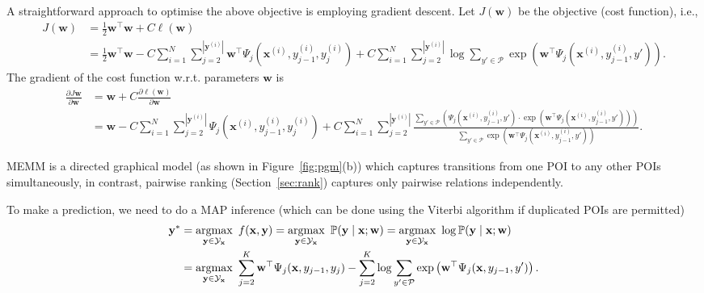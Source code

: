 A straightforward approach to optimise the above objective is employing gradient descent. 
Let $J(\mathbf{w})$ be the objective (cost function), i.e.,
\begin{align*}
J(\mathbf{w}) 
&= \frac{1}{2} \mathbf{w}^\top \mathbf{w} + C \ell(\mathbf{w}) \\
&= \frac{1}{2} \mathbf{w}^\top \mathbf{w} -
   C \sum_{i=1}^N \sum_{j=2}^{| \mathbf{y}^{(i)} |} \mathbf{w}^\top \Psi_j(\mathbf{x}^{(i)}, y_{j-1}^{(i)}, y_j^{(i)}) +
   C \sum_{i=1}^N \sum_{j=2}^{| \mathbf{y}^{(i)} |} \log \sum_{y' \in \mathcal{P}} 
     \exp \left(\mathbf{w}^\top \Psi_j(\mathbf{x}^{(i)}, y_{j-1}^{(i)}, y') \right).
\end{align*}
The gradient of the cost function w.r.t. parameters $\mathbf{w}$ is
\begin{align*}
\frac{\partial J{\mathbf{w}}}{\partial \mathbf{w}}
&= \mathbf{w} + C \frac{\partial \ell(\mathbf{w})}{\partial \mathbf{w}} \\
&= \mathbf{w} - C \sum_{i=1}^N \sum_{j=2}^{| \mathbf{y}^{(i)} |} \Psi_j(\mathbf{x}^{(i)}, y_{j-1}^{(i)}, y_j^{(i)}) +
   C \sum_{i=1}^N \sum_{j=2}^{| \mathbf{y}^{(i)} |} 
     \frac{\sum_{y' \in \mathcal{P}} \left( \Psi_j(\mathbf{x}^{(i)}, y_{j-1}^{(i)}, y') \cdot 
           \exp \left(\mathbf{w}^\top \Psi_j(\mathbf{x}^{(i)}, y_{j-1}^{(i)}, y') \right) \right)}
          {\sum_{y' \in \mathcal{P}} \exp \left(\mathbf{w}^\top \Psi_j(\mathbf{x}^{(i)}, y_{j-1}^{(i)}, y') \right)}.
\end{align*}


MEMM is a directed graphical model (as shown in Figure~\ref{fig:pgm}(b)) which captures transitions from one POI to any other POIs simultaneously, 
in contrast, pairwise ranking (Section~\ref{sec:rank}) captures only pairwise relations independently.

To make a prediction, we need to do a MAP inference (which can be done using the Viterbi algorithm if duplicated POIs are permitted)
\begin{equation}
\label{eq:testmemm}
\begin{aligned}
\mathbf{y}^* 
&= \operatorname*{argmax}_{\mathbf{y} \in \mathcal{Y}_\mathbf{x}}~f(\mathbf{x}, \mathbf{y})
 = \operatorname*{argmax}_{\mathbf{y} \in \mathcal{Y}_\mathbf{x}}~\mathbb{P}(\mathbf{y} \mid \mathbf{x}; \mathbf{w})
 = \operatorname*{argmax}_{\mathbf{y} \in \mathcal{Y}_\mathbf{x}}~\log \mathbb{P}(\mathbf{y} \mid \mathbf{x}; \mathbf{w}) \\
&= \operatorname*{argmax}_{\mathbf{y} \in \mathcal{Y}_\mathbf{x}}~\sum_{j=2}^{K} \mathbf{w}^\top \Psi_j(\mathbf{x}, y_{j-1}, y_j) - 
   \sum_{j=2}^{K} \log \sum_{y' \in \mathcal{P}} \exp \left(\mathbf{w}^\top \Psi_j(\mathbf{x}, y_{j-1}, y') \right).
\end{aligned}
\end{equation}

